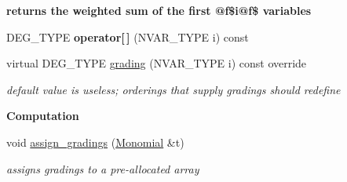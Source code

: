 \begin{Indent}\textbf{ returns the weighted sum of the first @f\$i@f\$ variables}\par
\begin{DoxyCompactItemize}
\item 
\mbox{\label{group__orderinggroup_a91af5dd81fbb141ab08be35acbd001a1}} 
D\+E\+G\+\_\+\+T\+Y\+PE {\bfseries operator\mbox{[}$\,$\mbox{]}} (N\+V\+A\+R\+\_\+\+T\+Y\+PE i) const
\item 
\mbox{\label{group__orderinggroup_a8490fdd2ae55fa7a25f896003da8128a}} 
virtual D\+E\+G\+\_\+\+T\+Y\+PE \hyperlink{group__orderinggroup_a8490fdd2ae55fa7a25f896003da8128a}{grading} (N\+V\+A\+R\+\_\+\+T\+Y\+PE i) const override
\begin{DoxyCompactList}\small\item\em default value is useless; orderings that supply gradings should redefine \end{DoxyCompactList}\end{DoxyCompactItemize}
\end{Indent}
\begin{Indent}\textbf{ Computation}\par
\begin{DoxyCompactItemize}
\item 
void \hyperlink{group__orderinggroup_a48f5464aaed30ba07d3eace69b2d87c1}{assign\+\_\+gradings} (\hyperlink{group__polygroup_class_monomial}{Monomial} \&t)
\begin{DoxyCompactList}\small\item\em assigns gradings to a pre-\/allocated array \end{DoxyCompactList}\end{DoxyCompactItemize}
\end{Indent}
